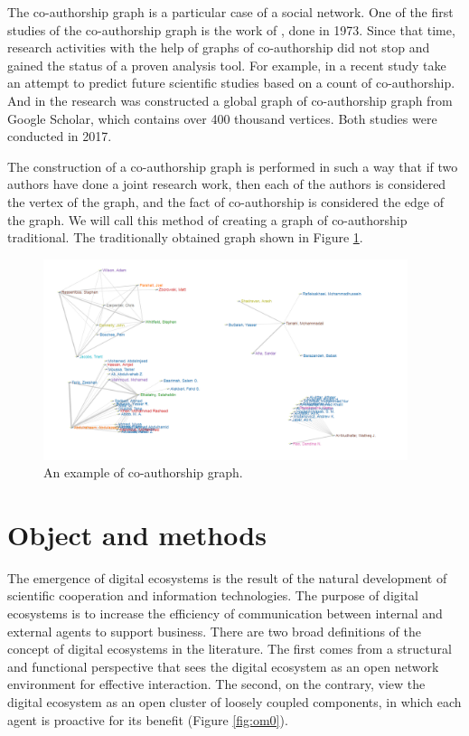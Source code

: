 \documentclass[12pt]{report}
\theoremstyle{definition}
\begin{document}
The co-authorship graph is a particular case of a social network. 
One of the first studies of the co-authorship graph is the work of \cite{mullins1973development}, done in 1973. 
Since that time, research activities with the help of graphs of co-authorship did not stop and gained the status of a proven analysis tool. 
For example, in a recent study \cite{chuan2018link} take an attempt to predict future scientific studies based on a count of co-authorship. 
And in the research \cite{chen2017building} was constructed a global graph of co-authorship graph from Google Scholar, which contains over 400 thousand vertices. 
Both studies were conducted in 2017.

The construction of a co-authorship graph is performed in such a way that if two authors have done a joint research work, then each of the authors is considered the vertex of the graph, and the fact of co-authorship is considered the edge of the graph. 
We will call this method of creating a graph of co-authorship traditional. 
The traditionally obtained graph shown in Figure \ref{fig:rev1}.

\begin{figure}[ht]
	\centering
	\includegraphics[width=0.95\textwidth]{rev1}
	\caption{An example of co-authorship graph.}
	\label{fig:rev1}
\end{figure}

\chapter{Object and methods}
\label{cha:objectandmethod}
The emergence of digital ecosystems is the result of the natural development of scientific cooperation and information technologies. 
The purpose of digital ecosystems is to increase the efficiency of communication between internal and external agents to support business. 
There are two broad definitions of the concept of digital ecosystems in the literature. 
The first comes from a structural and functional perspective that sees the digital ecosystem as an open network environment for effective interaction. The second, on the contrary, view the digital ecosystem as an open cluster of loosely coupled components, in which each agent is proactive for its benefit (Figure \ref{fig:om0}).
\end{document}
